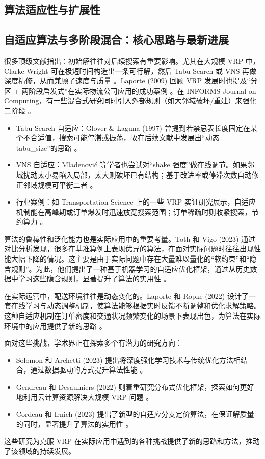 \documentclass[12pt,a4paper,twoside]{ctexbook}
\begin{document}
\subsection{算法适应性与扩展性}



\subsection{自适应算法与多阶段混合：核心思路与最新进展}
很多顶级文献指出：初始解往往对后续搜索有重要影响。尤其在大规模 VRP 中，Clarke-Wright 可在极短时间构造出一条可行解，然后 Tabu Search 或 VNS 再做深度精修，从而兼顾了速度与质量 \cite{2,4}。Laporte (2009) 回顾 VRP 发展时也提及“分区 + 两阶段启发式”在实际物流公司应用的成功案例 \cite{14}。在 INFORMS Journal on Computing，有一些混合式研究同时引入外部规则（如大邻域破坏/重建）来强化二阶段 \cite{9}。

\begin{itemize}
    \item Tabu Search 自适应：Glover \& Laguna (1997) 曾提到若禁忌表长度固定在某个不合适值，搜索可能停滞或振荡，故在后续文献中发展出“动态 tabu\_size”的思路 \cite{8}。
    \item VNS 自适应：Mladenović 等学者也尝试对“shake 强度”做在线调节。如果邻域扰动太小易陷入局部，太大则破坏已有结构；基于改进率或停滞次数自动修正邻域规模可平衡二者 \cite{5,9,10}。
    \item 行业案例：如 Transportation Science 上的一些 VRP 实证研究展示，自适应机制能在高峰期或订单爆发时迅速放宽搜索范围；订单稀疏时则收紧搜索，节约算力 \cite{8}。
\end{itemize}


算法的鲁棒性和泛化能力也是实际应用中的重要考量。Toth 和 Vigo (2023) 通过对比分析发现，很多在基准算例上表现优异的算法，在面对实际问题时往往出现性能大幅下降的情况。这主要是由于实际问题中存在大量难以量化的“软约束”和“隐含规则”。为此，他们提出了一种基于机器学习的自适应优化框架，通过从历史数据中学习这些隐含规则，显著提升了算法的实用性 \cite{21}。

在实际运营中，配送环境往往是动态变化的。Laporte 和 Ropke (2022) 设计了一套在线学习与动态调整机制，使算法能够根据实时反馈不断调整和优化求解策略。这种自适应机制在订单密度和交通状况频繁变化的场景下表现出色，为算法在实际环境中的应用提供了新的思路 \cite{22}。

面对这些挑战，学术界正在探索多个有潜力的研究方向：
\begin{itemize}
    \item Solomon 和 Archetti (2023) 提出将深度强化学习技术与传统优化方法相结合，通过数据驱动的方式提升算法性能 \cite{23}。
    \item Gendreau 和 Desaulniers (2022) 则着重研究分布式优化框架，探索如何更好地利用云计算资源解决大规模 VRP 问题 \cite{24}。
    \item Cordeau 和 Irnich (2023) 提出了新型的自适应分支定价算法，在保证解质量的同时，显著提升了算法的实用性 \cite{25}。
\end{itemize}
这些研究为克服 VRP 在实际应用中遇到的各种挑战提供了新的思路和方法，推动了该领域的持续发展。
\end{document}
